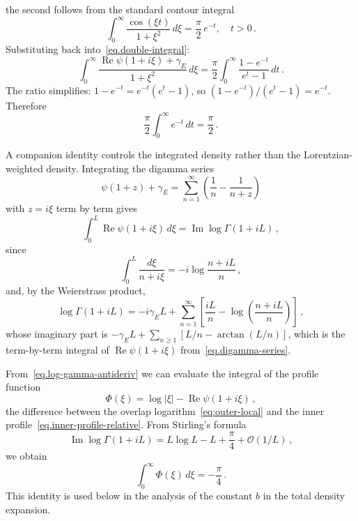 \documentclass[11pt,a4paper]{article}
\theoremstyle{definition}
\begin{document}
the second follows from the standard contour integral
\begin{equation}
    \int_0^{\infty} \frac{\cos(\xi t)}{1+\xi^2}  \,d\xi =  \frac{\pi}{2}\,e^{-t}, \quad t>0\, .
\end{equation}
Substituting back into~\eqref{eq.double-integral}:
\begin{equation}
  \int_0^{\infty} \frac{\operatorname{Re}\psi(1+i\xi)+\gamma_E}{1+\xi^2}\,d\xi
  = \frac{\pi}{2}\int_0^{\infty}\frac{1-e^{-t}}{e^t - 1}\,dt\,.
\end{equation}
The ratio simplifies: $1 - e^{-t} = e^{-t}(e^t - 1)$, so
$(1 - e^{-t})/(e^t - 1) = e^{-t}$.  Therefore
\begin{equation}
  \frac{\pi}{2}\int_0^{\infty} e^{-t}\,dt
  = \frac{\pi}{2}\,.
\end{equation}  

A companion identity controls the integrated density rather than the
Lorentzian-weighted density.  Integrating the digamma series
\begin{equation}\label{eq.digamma-series}
  \psi(1+z)+\gamma_E = \sum_{n=1}^\infty\left(\frac{1}{n} - \frac{1}{n+z}\right)
\end{equation}
with $z = i\xi$ term by term gives
\begin{equation}\label{eq.log-gamma-antideriv}
  \int_0^L \operatorname{Re}\psi(1+i\xi)\,d\xi
  = \operatorname{Im}\log\Gamma(1+iL)\,,
\end{equation}
since
\begin{equation}
  \int_0^L \frac{d\xi}{n+i\xi}
  = -i\log\frac{n+iL}{n}\,,
\end{equation}
and, by the Weierstrass product,
\begin{equation}\label{eq.weierstrass}
  \log\Gamma(1+iL)
  = -i\gamma_E L + \sum_{n=1}^{\infty}
    \left[\frac{iL}{n} - \log\left(\frac{n+iL}{n}\right)\right]\,,
\end{equation}
whose imaginary part is
$-\gamma_E L + \sum_{n\ge1}\left[L/n - \arctan(L/n)\right]$, which is the
term-by-term integral of $\operatorname{Re}\psi(1+i\xi)$
from~\eqref{eq.digamma-series}.

From~\eqref{eq.log-gamma-antideriv} we can evaluate the integral of the profile
function
\begin{equation}\label{eq.Phi-def}
  \Phi(\xi) = \log|\xi| - \operatorname{Re}\psi(1+i\xi)\,,
\end{equation}
the difference between the overlap logarithm~\eqref{eq:outer-local} and the
inner profile~\eqref{eq.inner-profile-relative}.  From Stirling's formula 
\begin{equation}
  \operatorname{Im}\log\Gamma(1+iL)
  = L\log L - L + \frac{\pi}{4} +\mathcal  O(1/L)\,,
\end{equation}
we obtain
\begin{equation}\label{eq.profile-integral}
  \int_0^\infty \Phi(\xi)\,d\xi = -\frac{\pi}{4}\,.
\end{equation}
This identity is used below in the analysis of the constant $b$
in the total density expansion.
\end{document}
